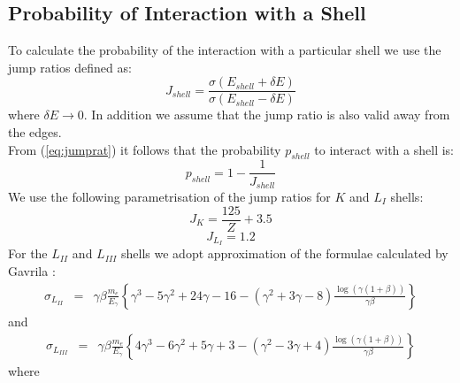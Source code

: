 \subsection{Probability of Interaction with a Shell}
To calculate the probability of the interaction with a particular shell we use
the jump ratios defined as:
\begin{equation}
J_{shell} = \frac{\sigma(E_{shell}+\delta E)}{\sigma(E_{shell}-\delta E)}
\label{eq:jumprat}
\end{equation}
where $\delta E \rightarrow 0$.
In addition we assume that the jump ratio is also valid away from the edges.\\
From (\ref{eq:jumprat}) it follows that the probability $p_{shell}$ 
to interact with a shell is:
\begin{equation}
p_{shell} = 1-\frac{1}{J_{shell}}
\label{eq:probrat}
\end{equation}
We use the following parametrisation of the jump ratios for $K$ and
$L_{I}$ shells\cite{bib-VEIGELE}:
\begin{equation}
J_K = \frac{125}{Z} + 3.5
\end{equation}
\begin{equation}
J_{L_{I}} = 1.2
\label{eq:jumpl1}
\end{equation}
For the $L_{II}$ and $L_{III}$ shells we adopt approximation of the formulae
calculated by Gavrila \cite{bib-GAVRILA-L}:
\begin{eqnarray}
\sigma_{L_{II}} &=& \gamma \beta \frac{m_e}{E_\gamma}
              \left\{
               \gamma^3-5\gamma^2+24\gamma-16
               -(\gamma^2+3\gamma-8)\frac{\log(\gamma(1+\beta))}{\gamma\beta}
              \right\}
\label{eq:sigmal2}
\end{eqnarray}
and
\begin{eqnarray}
\sigma_{L_{III}} &=& \gamma \beta \frac{m_e}{E_\gamma}
             \left\{
                4\gamma^3-6\gamma^2+5\gamma+3
               -(\gamma^2-3\gamma+4)\frac{\log(\gamma(1+\beta))}{\gamma\beta}
             \right\}
\label{eq:sigmal3}
\end{eqnarray}
where\\
 
